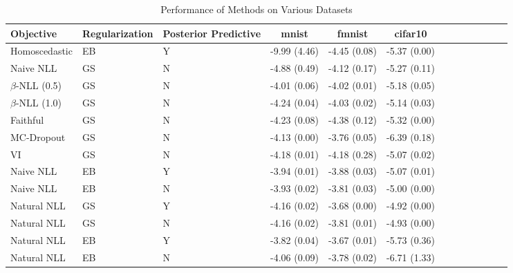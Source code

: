 \begin{table}
\centering
\caption{Performance of Methods on Various Datasets}
\label{tab:results}
\begin{tabular}{|l|l|l|c|c|c|c|c|c|c|c|c|c|}
\toprule
        Objective & Regularization & Posterior Predictive &        mnist &       fmnist &      cifar10 \\
\midrule
    Homoscedastic &             EB &                    Y & -9.99 (4.46) & -4.45 (0.08) & -5.37 (0.00) \\
        Naive NLL &             GS &                    N & -4.88 (0.49) & -4.12 (0.17) & -5.27 (0.11) \\
$\beta$-NLL (0.5) &             GS &                    N & -4.01 (0.06) & -4.02 (0.01) & -5.18 (0.05) \\
$\beta$-NLL (1.0) &             GS &                    N & -4.24 (0.04) & -4.03 (0.02) & -5.14 (0.03) \\
         Faithful &             GS &                    N & -4.23 (0.08) & -4.38 (0.12) & -5.32 (0.00) \\
       MC-Dropout &             GS &                    N & -4.13 (0.00) & -3.76 (0.05) & -6.39 (0.18) \\
               VI &             GS &                    N & -4.18 (0.01) & -4.18 (0.28) & -5.07 (0.02) \\
        Naive NLL &             EB &                    Y & -3.94 (0.01) & -3.88 (0.03) & -5.07 (0.01) \\
        Naive NLL &             EB &                    N & -3.93 (0.02) & -3.81 (0.03) & -5.00 (0.00) \\
      Natural NLL &             GS &                    Y & -4.16 (0.02) & -3.68 (0.00) & -4.92 (0.00) \\
      Natural NLL &             GS &                    N & -4.16 (0.02) & -3.81 (0.01) & -4.93 (0.00) \\
      Natural NLL &             EB &                    Y & -3.82 (0.04) & -3.67 (0.01) & -5.73 (0.36) \\
      Natural NLL &             EB &                    N & -4.06 (0.09) & -3.78 (0.02) & -6.71 (1.33) \\
\bottomrule
\end{tabular}
\end{table}
